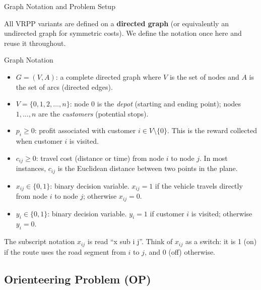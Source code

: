 \documentclass[aspectratio=169,10pt]{beamer}
\begin{document}
\begin{frame}[allowframebreaks]{Graph Notation and Problem Setup}

  All VRPP variants are defined on a \textbf{directed graph}
  (or equivalently an undirected graph for symmetric costs).
  We define the notation once here and reuse it throughout.

  \medskip
  \begin{block}{Graph Notation}
    \begin{itemize}
      \item $G = (V, A)$: a complete directed graph where $V$ is the set of
            nodes and $A$ is the set of arcs (directed edges).
      \item $V = \{0, 1, 2, \ldots, n\}$: node $0$ is the \emph{depot}
            (starting and ending point); nodes $1, \ldots, n$ are the
            \emph{customers} (potential stops).
      \item $p_i \ge 0$: profit associated with customer $i \in V \setminus \{0\}$.
            This is the reward collected when customer $i$ is visited.
      \item $c_{ij} \ge 0$: travel cost (distance or time) from node $i$
            to node $j$.
            In most instances, $c_{ij}$ is the Euclidean distance between
            two points in the plane.
      \item $x_{ij} \in \{0, 1\}$: binary decision variable.
            $x_{ij} = 1$ if the vehicle travels directly from node $i$ to
            node $j$; otherwise $x_{ij} = 0$.
      \item $y_i \in \{0, 1\}$: binary decision variable.
            $y_i = 1$ if customer $i$ is visited; otherwise $y_i = 0$.
    \end{itemize}
  \end{block}

  \medskip
  The subscript notation $x_{ij}$ is read ``x sub i j''.
  Think of $x_{ij}$ as a switch: it is 1 (on) if the route uses the road
  segment from $i$ to $j$, and 0 (off) otherwise.

\end{frame}

\subsection{Orienteering Problem (OP)}
\end{document}

